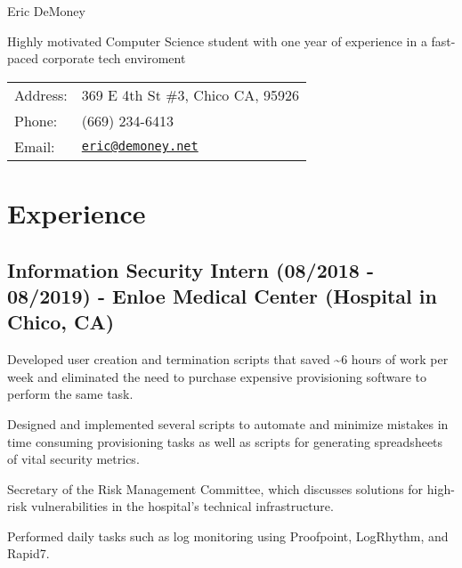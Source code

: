 \documentclass[letterpaper]{article}
\def\name{Eric DeMoney}
\renewenvironment{itemize}{
  \begin{list}{}{
    \setlength{\leftmargin}{1.5em}
  }
}{
  \end{list}
}
\begin{document}
{\huge \name}


\vspace{0.25in}

\begin{minipage}{0.475\linewidth}
    Highly motivated Computer Science student with one year of experience in a fast-paced corporate tech enviroment
\end{minipage}
\hspace{0.125cm}
\begin{minipage}{0.475\linewidth}
  \begin{tabular}{ll}
    Address: & 369 E 4th St \#3, Chico CA, 95926\\
    Phone: & (669) 234-6413 \\
    Email: & \href{mailto:eric@demoney.net}{\tt eric@demoney.net} \\
  \end{tabular}
\end{minipage}

\vspace{0.5in}

\section*{Experience}
\subsection*{Information Security Intern (08/2018 - 08/2019) - Enloe Medical Center (Hospital in Chico, CA)
}
\begin{itemize}
 \item Developed user creation and termination scripts that saved \textasciitilde 6 hours of work per week and eliminated the need to purchase expensive provisioning software to perform the same task.
 \item Designed and implemented several scripts to automate and minimize mistakes in time consuming provisioning tasks as well as scripts for generating spreadsheets of vital security metrics.
 \item Secretary of the Risk Management Committee, which discusses solutions for high-risk vulnerabilities in the hospital's technical infrastructure.
 \item Performed daily tasks such as log monitoring using Proofpoint, LogRhythm, and Rapid7.
\end{itemize}
\end{document}
